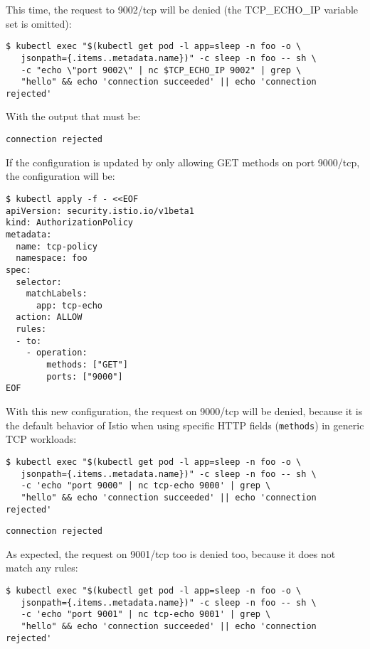 \noindent This time, the request to 9002/tcp will be denied (the TCP\_ECHO\_IP variable set is omitted):

\begin{lstlisting}
$ kubectl exec "$(kubectl get pod -l app=sleep -n foo -o \
   jsonpath={.items..metadata.name})" -c sleep -n foo -- sh \ 
   -c "echo \"port 9002\" | nc $TCP_ECHO_IP 9002" | grep \
   "hello" && echo 'connection succeeded' || echo 'connection rejected'
\end{lstlisting}

\noindent With the output that must be:

\begin{lstlisting}
connection rejected
\end{lstlisting}

If the configuration is updated by only allowing GET methods on port 9000/tcp, the configuration will be:

\begin{lstlisting}
$ kubectl apply -f - <<EOF
apiVersion: security.istio.io/v1beta1
kind: AuthorizationPolicy
metadata:
  name: tcp-policy
  namespace: foo
spec:
  selector:
    matchLabels:
      app: tcp-echo
  action: ALLOW
  rules:
  - to:
    - operation:
        methods: ["GET"]
        ports: ["9000"]
EOF
\end{lstlisting}

\noindent With this new configuration, the request on 9000/tcp will be denied, because it is the default behavior of Istio when using specific HTTP fields (\texttt{methods}) in generic TCP workloads:

\begin{lstlisting}
$ kubectl exec "$(kubectl get pod -l app=sleep -n foo -o \
   jsonpath={.items..metadata.name})" -c sleep -n foo -- sh \ 
   -c 'echo "port 9000" | nc tcp-echo 9000' | grep \
   "hello" && echo 'connection succeeded' || echo 'connection rejected'
\end{lstlisting}

\begin{lstlisting}
connection rejected
\end{lstlisting}

\noindent As expected, the request on 9001/tcp too is denied too, because it does not match any rules:

\begin{lstlisting}
$ kubectl exec "$(kubectl get pod -l app=sleep -n foo -o \
   jsonpath={.items..metadata.name})" -c sleep -n foo -- sh \ 
   -c 'echo "port 9001" | nc tcp-echo 9001' | grep \
   "hello" && echo 'connection succeeded' || echo 'connection rejected'
\end{lstlisting}

